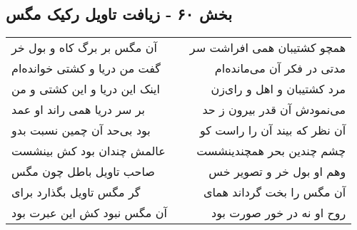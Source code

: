 \begin{center}
\section*{بخش ۶۰ - زیافت تاویل رکیک مگس}
\label{sec:sh060}
\begin{longtable}{l p{0.5cm} r}
آن مگس بر برگ کاه و بول خر
&&
همچو کشتیبان همی افراشت سر
\\
گفت من دریا و کشتی خوانده‌ام
&&
مدتی در فکر آن می‌مانده‌ام
\\
اینک این دریا و این کشتی و من
&&
مرد کشتیبان و اهل و رای‌زن
\\
بر سر دریا همی راند او عمد
&&
می‌نمودش آن قدر بیرون ز حد
\\
بود بی‌حد آن چمین نسبت بدو
&&
آن نظر که بیند آن را راست کو
\\
عالمش چندان بود کش بینشست
&&
چشم چندین بحر همچندینشست
\\
صاحب تاویل باطل چون مگس
&&
وهم او بول خر و تصویر خس
\\
گر مگس تاویل بگذارد برای
&&
آن مگس را بخت گرداند همای
\\
آن مگس نبود کش این عبرت بود
&&
روح او نه در خور صورت بود
\\
\end{longtable}
\end{center}
